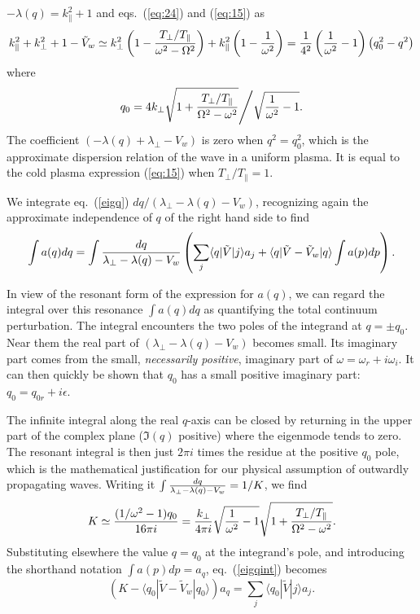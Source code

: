 \documentclass[12pt]{article}
\def\ket#1{|#1\rangle}
\def\bra#1{\langle#1}
\begin{document}
$-\lambda(q)=k_\parallel^2+1$ and eqs.\ (\ref{eq:24}) and (\ref{eq:15}) as
\begin{equation}
  \label{}
  k_\parallel^2+k_\perp^2+1-\tilde
  V_w\simeq k_\perp^2\left(1-{T_\perp/T_\parallel\over\omega^2-\Omega^2}\right)
  +k_\parallel^2\left(1-{1\over\omega^2}\right)
= {1\over4^2}\left({1\over\omega^2}-1\right)\left(q_0^2-q^2\right)
\end{equation}
where
\begin{equation}
  \label{eq:26}
  q_0=4k_\perp\sqrt{1+{T_\perp/T_\parallel\over\Omega^2-\omega^2}}
  \Bigg/\sqrt{{1\over\omega^2}-1}.
\end{equation}
The coefficient $(-\lambda(q)+\lambda_\perp-V_w) $ is zero when
$q^2=q_0^2$, which is the approximate dispersion relation of the wave
in a uniform plasma. It is equal to the cold plasma expression
(\ref{eq:15}) when $T_\perp/T_\parallel=1$.



We integrate eq.\ (\ref{eigq})  $dq/(\lambda_\perp-\lambda(q)-V_w)$, recognizing again the approximate independence of $q$ of
the right hand side to find
\begin{equation}
  \label{eigqint}
  \int a(q) dq =\int {dq\over \lambda_\perp-\lambda(q)-V_w}
  \left(\sum_j\bra{q}|\tilde{V}\ket{j}a_j
+\bra{q}|\tilde V-\tilde V_w\ket{q}\int a(p)dp \right).
\end{equation}

In view of the resonant form of the expression for $a(q)$, we can
regard the integral over this resonance $\int a(q) dq$ as quantifying
the total continuum perturbation.  The integral encounters the two
poles of the integrand at $q=\pm q_0$.
Near them the real part of $(\lambda_\perp-\lambda(q)-V_w)$ becomes small. Its
imaginary part comes from the small, \emph{necessarily positive},
imaginary part of
$\omega=\omega_r+i\omega_i$. It can then quickly be shown that
$q_0$ has a small positive imaginary part: $q_0=q_{0r}+i\epsilon$.

The infinite integral along the real
$q$-axis can be closed by returning in the upper part of the complex
plane ($\Im(q)$ positive) where the eigenmode tends
to zero. The resonant integral is then just $2\pi i$ times the residue
at the positive $q_0$ pole, which is the mathematical
  justification for our physical assumption of outwardly
  propagating waves. Writing it
$\int {dq\over \lambda_\perp-\lambda(q)-V_w}=1/K$,  we find
\begin{equation}
  \label{Kdef}
  K\simeq{(1/\omega^2-1)q_0\over16\pi i}
  ={k_\perp\over4\pi i}\sqrt{{1\over\omega^2}-1}
\sqrt{1+{T_\perp/T_\parallel\over\Omega^2-\omega^2}}.  
\end{equation}
Substituting elsewhere the
value $q=q_0$ at the integrand's pole, and introducing the shorthand
notation $\int a(p) dp= a_q$, eq.\ (\ref{eigqint}) becomes
\begin{equation}
  \label{eigqint2}
  (K-\bra{q_0}|\tilde V-\tilde V_w\ket{q_0})a_q %
  = \sum_j\bra{q_0}|\tilde{V}\ket{j}a_j.
\end{equation}
\end{document}

